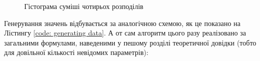 \documentclass[a4paper,14pt]{extarticle} %
\numberwithin{equation}{section}
\begin{document}
\begin{figure}[H]
    \caption{Гістограма суміші чотирьох розподілів}
    \label{figure: 4input histogram}
\end{figure}

Генерування значень відбувається за аналогічною схемою, як це показано на Лістингу \ref{code: generating data}. А от сам алгоритм цього разу реалізовано за загальними формулами, наведеними у пешому розділі теоретичної довідки (тобто для довільної кількості невідомих параметрів):
\end{document}
